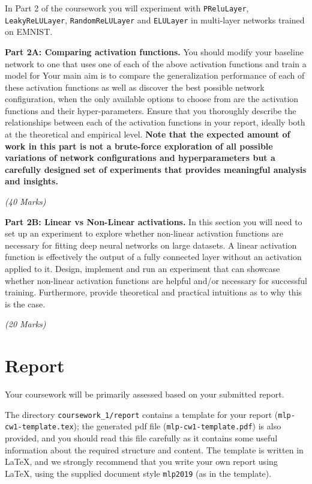 \documentclass[11pt,]{article}
\begin{document}
In Part 2 of the coursework you will experiment with \texttt{PReluLayer}, \texttt{LeakyReLULayer}, \texttt{RandomReLULayer} and \texttt{ELULayer} in multi-layer networks trained on EMNIST. 

\textbf{Part 2A: Comparing activation functions.}
You should modify your baseline network to one that uses one of each of the above activation functions and train a model for 
Your main aim is to compare the generalization performance of each of these activation functions as well as discover the best possible network configuration, when the only available options to choose from are the activation functions and their hyper-parameters. Ensure that you thoroughly describe the relationships between each of the activation functions in your report, ideally both at the theoretical and empirical level. \textbf{Note that the expected amount of work in this part is not a brute-force exploration of all possible variations of network configurations and hyperparameters but a carefully designed set of experiments that provides meaningful analysis and insights.}

\emph{(40 Marks)}

\textbf{Part 2B: Linear vs Non-Linear activations.}
In this section you will need to set up an experiment to explore whether non-linear activation functions are necessary for fitting deep neural networks on large datasets. A linear activation function is effectively the output of a fully connected layer without an activation applied to it. Design, implement and run an experiment that can showcase whether non-linear activation functions are helpful and/or necessary for successful training. Furthermore, provide theoretical and practical intuitions as to why this is the case.

\emph{(20 Marks)}
\section{Report}
\label{sec:report}
Your coursework will be primarily assessed based on your submitted report.

The directory \verb+coursework_1/report+ contains a template for your report (\verb+mlp-cw1-template.tex+);  the generated pdf file (\verb+mlp-cw1-template.pdf+) is also provided, and you should read this file carefully as it contains some useful information about the required structure and content. The template is written in LaTeX, and we strongly recommend that you write your own report using LaTeX, using the supplied document style \verb+mlp2019+ (as in the template).
\end{document}
